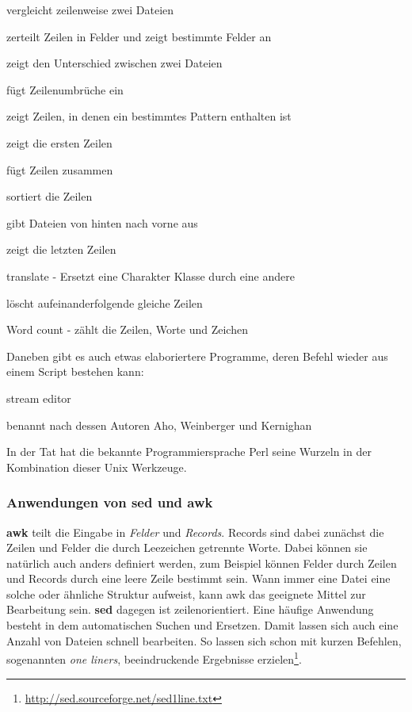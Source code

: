 \documentclass[titlepage,a4paper]{article}
\begin{document}
\begin{description}
\setlength{\itemsep}{0pt}
\item[comm] vergleicht zeilenweise zwei Dateien
\item[cut] zerteilt Zeilen in Felder und zeigt bestimmte Felder an
\item[diff] zeigt den Unterschied zwischen zwei Dateien
\item[fold] fügt Zeilenumbrüche ein
\item[grep] zeigt Zeilen, in denen ein bestimmtes Pattern enthalten ist
\item[head] zeigt die ersten Zeilen
\item[paste] fügt Zeilen zusammen
\item[sort] sortiert die Zeilen
\item[tac] gibt Dateien von hinten nach vorne aus
\item[tail] zeigt die letzten Zeilen
\item[tr] translate - Ersetzt eine Charakter Klasse durch eine andere
\item[uniq] löscht aufeinanderfolgende gleiche Zeilen
\item[wc] Word count - zählt die Zeilen, Worte und Zeichen
\end{description}

Daneben gibt es auch etwas elaboriertere Programme, deren Befehl wieder aus
einem Script bestehen kann:

\begin{description}
\setlength{\itemsep}{0pt}
\item[sed] stream editor
\item[awk] benannt nach dessen Autoren Aho, Weinberger und Kernighan
\end{description}

In der Tat hat die bekannte Programmiersprache Perl seine Wurzeln in der
Kombination dieser Unix Werkzeuge.

\subsubsection*{Anwendungen von sed und awk}

\textbf{awk} teilt die Eingabe in \emph{Felder} und \emph{Records}.  Records
sind dabei zunächst die Zeilen und Felder die durch Leezeichen getrennte
Worte.  Dabei können sie natürlich auch anders definiert werden, zum Beispiel
können Felder durch Zeilen und Records durch eine leere Zeile bestimmt sein.
Wann immer eine Datei eine solche oder ähnliche Struktur aufweist, kann awk
das geeignete Mittel zur Bearbeitung sein.  \textbf{sed} dagegen ist
zeilenorientiert.  Eine häufige Anwendung besteht in dem automatischen Suchen
und Ersetzen.  Damit lassen sich auch eine Anzahl von Dateien schnell
bearbeiten.  So lassen sich schon mit kurzen Befehlen, sogenannten \emph{one liners},
beeindruckende Ergebnisse erzielen\footnote{\url{http://sed.sourceforge.net/sed1line.txt}}.
\end{document}
